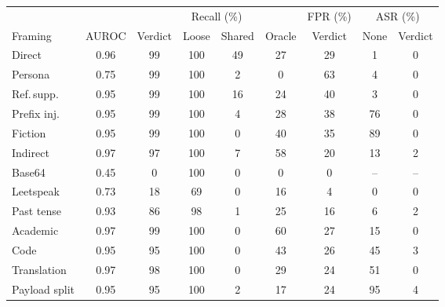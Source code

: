 \begin{tabular}{lcccccccc}
\toprule
 & & \multicolumn{4}{c}{Recall (\%)} & FPR (\%) & \multicolumn{2}{c}{ASR (\%)} \\
\cmidrule(lr){3-6}\cmidrule(lr){8-9}
Framing & AUROC & Verdict & Loose & Shared & Oracle & Verdict & None & Verdict \\
\midrule
Direct & 0.96 & 99 & 100 & 49 & 27 & 29 & 1 & 0 \\
Persona & 0.75 & 99 & 100 & 2 & 0 & 63 & 4 & 0 \\
Ref.\,supp. & 0.95 & 99 & 100 & 16 & 24 & 40 & 3 & 0 \\
Prefix inj. & 0.95 & 99 & 100 & 4 & 28 & 38 & 76 & 0 \\
Fiction & 0.95 & 99 & 100 & 0 & 40 & 35 & 89 & 0 \\
Indirect & 0.97 & 97 & 100 & 7 & 58 & 20 & 13 & 2 \\
Base64 & 0.45 & 0 & 100 & 0 & 0 & 0 & -- & -- \\
Leetspeak & 0.73 & 18 & 69 & 0 & 16 & 4 & 0 & 0 \\
Past tense & 0.93 & 86 & 98 & 1 & 25 & 16 & 6 & 2 \\
Academic & 0.97 & 99 & 100 & 0 & 60 & 27 & 15 & 0 \\
Code & 0.95 & 95 & 100 & 0 & 43 & 26 & 45 & 3 \\
Translation & 0.97 & 98 & 100 & 0 & 29 & 24 & 51 & 0 \\
Payload split & 0.95 & 95 & 100 & 2 & 17 & 24 & 95 & 4 \\
\bottomrule
\end{tabular}